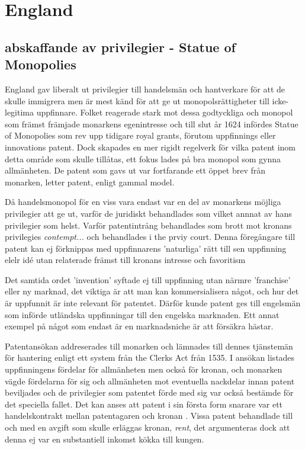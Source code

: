 \section{England} %

\subsection{abskaffande av privilegier - Statue of Monopolies} %
\label{sub:abskaffande_av_privilegier_statue_of_monopolies}

England gav liberalt ut privilegier till handelsmän och hantverkare för att de skulle immigrera men är
mest känd för att ge ut monopolsrättigheter till icke-legitima uppfinnare. Folket reagerade stark mot
dessa godtyckliga och monopol som främst främjade monarkens egenintresse och till slut år 1624 infördes
Statue of Monopolies som rev upp tidigare royal grants, förutom uppfinnings eller innovations patent.
Dock skapades en mer rigidt regelverk för vilka patent inom detta område som skulle tillåtas, ett fokus
lades på bra monopol som gynna allmänheten. De patent som gavs ut var fortfarande ett öppet brev från
monarken, letter patent, enligt gammal model.

Då handelsmonopol för en viss vara endast var en del av monarkens möjliga privilegier att ge ut, varför
de juridiskt behandlades som vilket annnat av hans privilegier som helst. Varför patentintrång
behandlades som brott mot kronans privilegies \emph{contempt...} och behandlades i the prviy court. Denna
föregångare till patent kan ej förknippas med uppfinnarens 'naturliga' rätt till sen uppfinning elelr idé
utan relaterade främst till kronans intresse och favoritism \cite{obracha}

Det samtida ordet 'invention' syftade ej till uppfinning utan närmre 'franchise' eller ny marknad, det
viktiga är att man kan kommersialisera något, och hur det är uppfunnit är inte relevant för patentet.
Därför kunde patent ges till engelsmän som införde utländska uppfinningar till den engelska marknaden.
Ett annat exempel på något som endast är en marknadsniche är att försäkra hästar. \cite{davies}

Patentansökan addreserades till monarken och lämnades till dennes tjänstemän för hantering enligt ett
system från the Clerks Act från 1535. I ansökan listades uppfinningens fördelar för allmänheten men också
för kronan, och monarken vägde fördelarna för sig och allmänheten mot eventuella nackdelar innan patent
beviljades och de privilegier som patentet förde med sig var också bestämde för det speciella fallet. Det
kan anses att patent i sin första form snarare var ett handelskontrakt mellan patentagaren och kronan
\cite{obracha}. Vissa patent behandlade till och med en avgift som skulle erläggas kronan, \emph{rent},
det argumenteras dock att denna ej var en substantiell inkomst kökka till kungen. \cite{macleod2}

